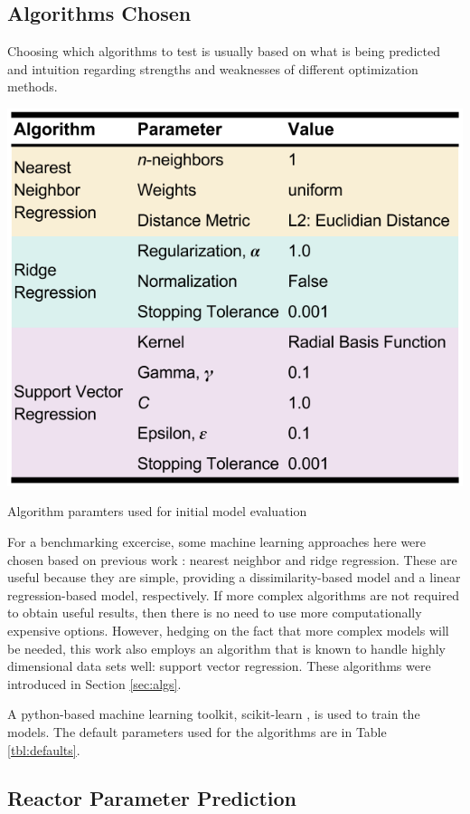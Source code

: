 \subsection{Algorithms Chosen}
\label{sec:choice}

Choosing which algorithms to test is usually based on what is being predicted
and intuition regarding strengths and weaknesses of different optimization
methods.  

\begin{table}[!htb]
  \centering
  \includegraphics[width=0.8\linewidth]{./chapters/demo_method/defaults.png}
  \caption{Algorithm paramters used for initial model evaluation}
  \label{tbl:defaults}
\end{table}

For a benchmarking excercise, some machine learning approaches here were chosen
based on previous work \cite{dayman_feasibility_2013}: nearest neighbor and
ridge regression. These are useful because they are simple, providing a
dissimilarity-based model and a linear regression-based model, respectively. If
more complex algorithms are not required to obtain useful results, then there
is no need to use more computationally expensive options. However, hedging on
the fact that more complex models will be needed, this work also employs an
algorithm that is known to handle highly dimensional data sets well: support
vector regression. These algorithms were introduced in Section \ref{sec:algs}. 

A python-based machine learning toolkit, scikit-learn \cite{scikit}, is used to
train the models. The default parameters used for the algorithms are in
Table \ref{tbl:defaults}.

\subsection{Reactor Parameter Prediction}
\label{sec:rxtrparam}

